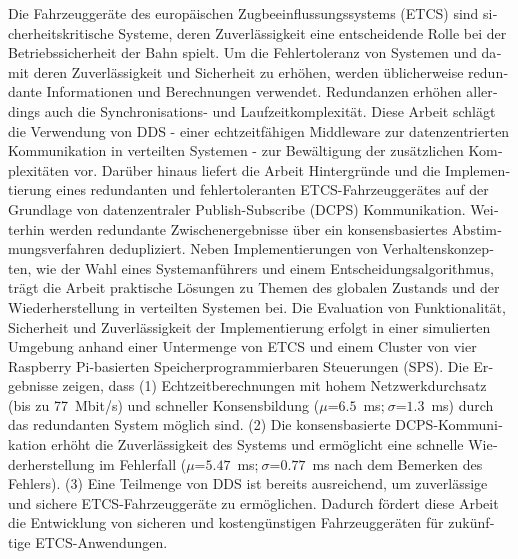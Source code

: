 \null\vfil
\begin{otherlanguage}{ngerman}
\begin{center}\textsf{\textbf{\abstractname}}\end{center}

\noindent 
Die Fahrzeuggeräte des europäischen Zugbeeinflussungssystems (ETCS) sind sicherheitskritische Systeme, deren Zuverlässigkeit eine entscheidende Rolle bei der Betriebssicherheit der Bahn spielt.
Um die Fehlertoleranz von Systemen und damit deren Zuverlässigkeit und Sicherheit zu erhöhen, werden üblicherweise redundante Informationen und Berechnungen verwendet.
Redundanzen erhöhen allerdings auch die Synchronisations- und Laufzeitkomplexität.
Diese Arbeit schlägt die Verwendung von DDS - einer echtzeitfähigen Middleware zur datenzentrierten Kommunikation in verteilten Systemen - zur Bewältigung der zusätzlichen Komplexitäten vor.
Darüber hinaus liefert die Arbeit Hintergründe und die Implementierung eines redundanten und fehlertoleranten ETCS-Fahrzeuggerätes auf der Grundlage von datenzentraler Publish-Subscribe (DCPS) Kommunikation.
Weiterhin werden redundante Zwischenergebnisse über ein konsensbasiertes Abstimmungsverfahren dedupliziert.
Neben Implementierungen von Verhaltenskonzepten, wie der Wahl eines Systemanführers und einem Entscheidungsalgorithmus, trägt die Arbeit praktische Lösungen zu Themen des globalen Zustands und der Wiederherstellung in verteilten Systemen bei.
Die Evaluation von Funktionalität, Sicherheit und Zuverlässigkeit der Implementierung erfolgt in einer simulierten Umgebung anhand einer Untermenge von ETCS und einem Cluster von vier Raspberry Pi-basierten Speicherprogrammierbaren Steuerungen (SPS).
Die Ergebnisse zeigen, dass (1) Echtzeitberechnungen mit hohem Netzwerkdurchsatz (bis zu 77~Mbit/s) und schneller Konsensbildung ($\mu$=$6.5$~ms;$~\sigma$=$1.3$~ms) durch das redundanten System möglich sind.
(2) Die konsensbasierte DCPS-Kommunikation erhöht die Zuverlässigkeit des Systems und ermöglicht eine schnelle Wiederherstellung im Fehlerfall ($\mu$=$5.47$~ms;$~\sigma$=$0.77$~ms nach dem Bemerken des Fehlers).
(3) Eine Teilmenge von DDS ist bereits ausreichend, um zuverlässige und sichere ETCS-Fahrzeuggeräte zu ermöglichen.
Dadurch fördert diese Arbeit die Entwicklung von sicheren und kostengünstigen Fahrzeuggeräten für zukünftige ETCS-Anwendungen.

\end{otherlanguage}
\vfil\null


